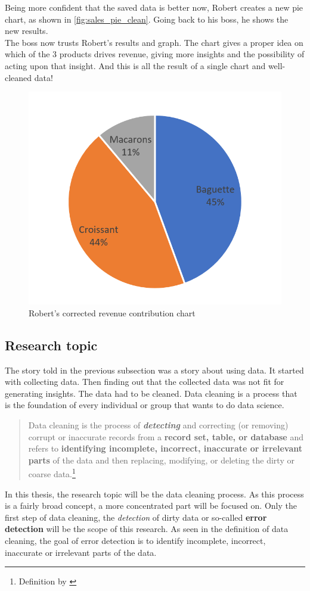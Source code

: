 Being more confident that the saved data is better now, Robert creates a new pie chart, as shown in \autoref{fig:sales_pie_clean}. Going back to his boss, he shows the new results. 
~\\The boss now trusts Robert's results and graph. The chart gives a proper idea on which of the 3 products drives revenue, giving more insights and the possibility of acting upon that insight.
And this is all the result of a single chart and well-cleaned data!

\begin{figure}[H]
    \centering
    \includegraphics[width=0.5\linewidth]{thesis/Figures/Sales_Pie_Clean.png}
    \caption{Robert's corrected revenue contribution chart}
    \label{fig:sales_pie_clean}
\end{figure}

\subsection{Research topic}
The story told in the previous subsection was a story about using data. It started with collecting data. Then finding out that the collected data was not fit for generating insights. The data had to be cleaned. Data cleaning is a process that is the foundation of every individual or group that wants to do data science.

\blockquote{Data cleaning is the process of \textbf{\textit{detecting}} and correcting (or removing) corrupt or inaccurate records from a \textbf{record set, table, or database} and refers to \textbf{identifying incomplete, incorrect, inaccurate or irrelevant parts} of the data and then replacing, modifying, or deleting the dirty or coarse data.\footnote{Definition by \cite{Wikipedia_contributors2020-ya}}}

In this thesis, the research topic will be the data cleaning process. As this process is a fairly broad concept, a more concentrated part will be focused on. Only the first step of data cleaning, the \textit{detection} of dirty data or so-called \textbf{error detection} will be the scope of this research.
As seen in the definition of data cleaning, the goal of error detection is to identify incomplete, incorrect, inaccurate or irrelevant parts of the data. 

